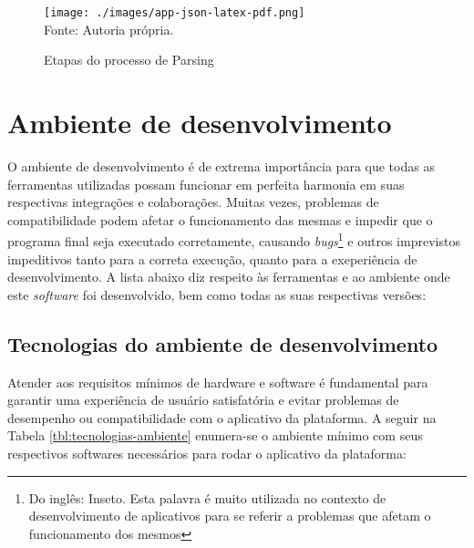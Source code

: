 \begin{figure}[H]
    \centering
    \caption{Etapas do processo de Parsing}
    \texttt{[image: ./images/app-json-latex-pdf.png]}
    \label{fig:app-json-latex-pdf} \\
    \textnormal{\fontsize{10pt}{12pt}Fonte: Autoria própria.}
\end{figure}

\section{Ambiente de desenvolvimento}

O ambiente de desenvolvimento é de extrema importância para que todas as ferramentas
utilizadas possam funcionar em perfeita harmonia em suas respectivas integrações e
colaborações. Muitas vezes, problemas de compatibilidade podem afetar
o funcionamento das mesmas e impedir que o programa final
seja executado corretamente, causando
\textit{bugs}\footnote{Do inglês: Inseto. Esta palavra é muito utilizada no contexto de desenvolvimento de aplicativos
para se referir a problemas que afetam o funcionamento dos mesmos
}
e outros imprevistos impeditivos tanto para a correta execução, quanto
para a exeperiência de desenvolvimento.
A lista abaixo diz respeito às ferramentas e ao ambiente onde este \textit{software}
foi desenvolvido, bem como todas as suas respectivas versões:

\clearpage

\subsection{Tecnologias do ambiente de desenvolvimento}

Atender aos requisitos mínimos de hardware
e software é fundamental para garantir uma experiência de usuário satisfatória
e evitar problemas de desempenho ou compatibilidade com o aplicativo da plataforma.
A seguir
na
Tabela \ref{tbl:tecnologias-ambiente}
enumera-se o ambiente mínimo com seus respectivos softwares necessários
para rodar o aplicativo da plataforma:

